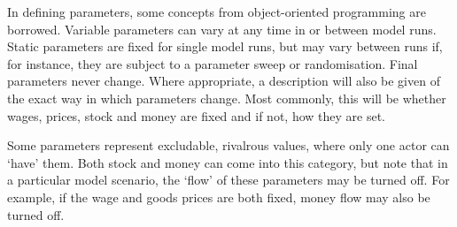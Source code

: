 In defining parameters, some concepts from object-oriented programming are borrowed. Variable parameters can vary at any time in or between model runs. Static parameters are fixed for single model runs, but may vary between runs if, for instance, they are subject to a parameter sweep or randomisation. Final parameters never change. Where appropriate, a description will also be given of the exact way in which parameters change. Most commonly, this will be whether wages, prices, stock and money are fixed and if not, how they are set. 

Some parameters represent excludable, rivalrous values, where only one actor can `have' them. Both stock and money can come into this category, but note that in a particular model scenario, the `flow' of these parameters may be turned off. For example, if the wage and goods prices are both fixed, money flow may also be turned off.

